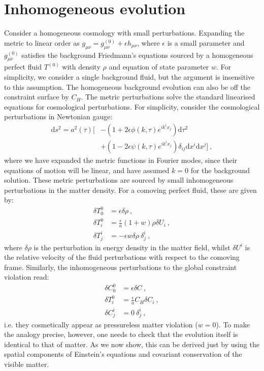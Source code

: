 \documentclass[amsmath,amssymb,11pt]{article}
\begin{document}
\section{Inhomogeneous evolution} \label{app:inhomogeneous}
Consider a homogeneous cosmology with small perturbations. Expanding the metric to linear order as $g_{\mu\nu} = g^{(0)}_{\mu\nu}+ \epsilon h_{\mu\nu}$, where $\epsilon$ is a small parameter and $g^{(0)}_{\mu\nu}$ satisfies the background Friedmann's equations sourced by a homogeneous perfect fluid $T^{(0)}$ with density $\rho$ and equation of state parameter $w$. For simplicity, we consider a single background fluid, but the argument is insensitive to this assumption. The homogeneous background evolution can also be off the constraint surface by $C_H$. The metric perturbations solve the standard linearised equations for cosmological perturbations. For simplicity, consider the cosmological perturbations in Newtonian gauge:
\begin{equation}
\begin{split}
    \text{d}s^2 = a^2(\tau) \Big[& -\left(1+2 \epsilon \phi(k,\tau) e^{ik^i x_j} \right) \text{d}\tau^2 \\
    & + \left(1-2 \epsilon \psi(k,\tau) e^{ik^i x_j} \right) \delta_{ij} \text{d}x^i \text{d}x^j \Big] \ ,
\end{split}
\end{equation}
where we have expanded the metric functions in Fourier modes, since their equations of motion will be linear, and have assumed $k=0$ for the background solution. These metric perturbations are sourced by small inhomogeneous perturbations in the matter density. For a comoving perfect fluid, these are given by:
\begin{equation}
\begin{split}
    \delta T^{0}_0 &= \epsilon \delta \rho \ , \\
    \delta T^{0}_i &= \frac{\epsilon}{a}(1+w) \rho  \delta U_i \ , \\
    \delta T^{i}_j &= - \epsilon w \delta \rho \ \delta^i_j \ , 
\end{split}
\end{equation}
where $\delta \rho$ is the perturbation in energy density in the matter field, whilst $\delta U^i$ is the relative velocity of the fluid perturbations with respect to the comoving frame. Similarly, the  inhomogeneous perturbations to the global constraint violation read: 
\begin{equation}
\begin{split}
    \delta C^{0}_0 &=\epsilon \delta C \ , \\ 
    \delta T^{0}_i &= \frac{\epsilon}{a} C_H \delta C_i \ ,  \\
    \delta C^{i}_j &= 0 \ \delta^i_j \ , 
\end{split}
\end{equation}
i.e. they cosmetically appear as pressureless matter violation ($w=0$). To make the analogy precise, however, one needs to check that the evolution itself is identical to that of matter. As we now show, this can be derived just by using the spatial components of Einstein's equations and covariant conservation of the visible matter.
\end{document}
